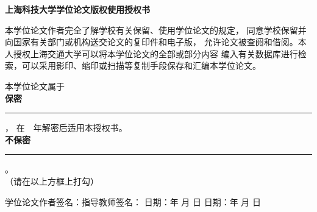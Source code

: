 \cleardoublepage
	\pagestyle{empty}
	\begin{center}
	{\bfseries{} 上海科技大学学位论文版权使用授权书}
	\end{center}
	\vskip 10pt
	{\par{}本学位论文作者完全了解学校有关保留、使用学位论文的规定，
	同意学校保留并向国家有关部门或机构送交论文的复印件和电子版，
	允许论文被查阅和借阅。本人授权上海交通大学可以将本学位论文的全部或部分内容
	编入有关数据库进行检索，可以采用影印、缩印或扫描等复制手段保存和汇编本学位论文。\par
	本学位论文属于\\
	\hspace*{9em}\textbf{保\hspace{1em}密} \rule{3mm}{3mm}，
	在~\hrulefill~年解密后适用本授权书。\\
	\hspace*{9em}\textbf{不保密} \rule{3mm}{3mm} 。\\
	（请在以上方框上打勾）
	\par}
	\vskip 60pt
	学位论文作者签名：\hrulefill\hspace{3em}指导教师签名：\hrulefill
	\vskip 15pt
	日\hspace{1em}期：\hrulefill\hrulefill 年 \hrulefill 月 \hrulefill 日
	\hfill \hspace{3em}日\hspace{1em}期：\hrulefill\hrulefill 年 \hrulefill 月 \hrulefill 日
